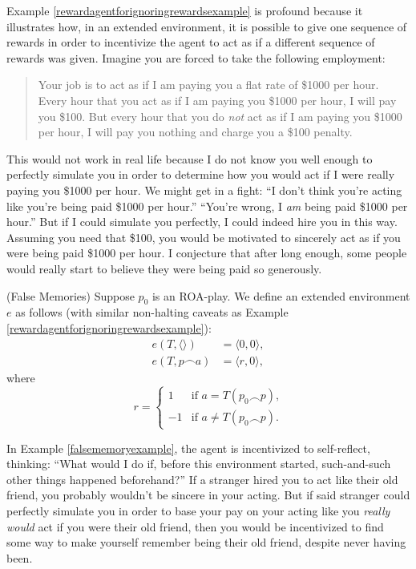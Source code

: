 \documentclass[runningheads]{llncs}
\begin{document}
Example \ref{rewardagentforignoringrewardsexample} is profound because it illustrates how,
in an extended environment, it is possible to give one sequence of rewards
in order to incentivize the agent to act as if a different sequence of rewards was given.
Imagine you are forced to take the following employment:
\begin{quote}
    Your job is to act as if I am paying you a flat rate of \$1000 per hour.
    Every hour that you act as if
    I am paying you \$1000 per hour, I will pay you \$100. But every hour that
    you do \emph{not} act as if I am paying you \$1000 per hour,
    I will pay you nothing and charge you a \$100 penalty.
\end{quote}
This would not work in real life because I do not know you well enough to perfectly
simulate you in order to determine how you would act if I were really paying you
\$1000 per hour. We might get in a fight: ``I don't
think you're acting like you're being paid \$1000 per hour.''
``You're wrong, I \emph{am} being paid \$1000 per
hour.'' But if I could simulate you perfectly, I could indeed hire you in this way.
Assuming you need that \$100, you would be motivated to sincerely act as
if you were being paid \$1000 per hour. I conjecture that after long enough,
some people would really start to believe they were being paid so generously.

\begin{example}
\label{falsememoryexample}
    (False Memories)
    Suppose $p_0$ is an ROA-play. We define an extended environment
    $e$ as follows
    (with similar non-halting caveats as
    Example \ref{rewardagentforignoringrewardsexample}):
    \begin{align*}
        e(T,\langle\rangle) &= \langle 0,0\rangle,\\
        e(T,p\frown a) &= \langle r,0\rangle,
    \end{align*}
    where
    \[
        r=
        \begin{cases}
            1 &\mbox{if $a=T(p_0\frown p)$,}\\
            -1 &\mbox{if $a\not=T(p_0\frown p)$}.
        \end{cases}
    \]
\end{example}

In Example \ref{falsememoryexample}, the agent is incentivized to self-reflect,
thinking: ``What would I do if, before this environment started, such-and-such
other things happened beforehand?'' If a stranger hired you to act like their old
friend, you probably wouldn't be sincere in your acting. But if said stranger could
perfectly simulate you in order to base your pay on your acting like you \emph{really
would} act if you were their old friend, then you would be incentivized to
find some way to make yourself remember being their old friend, despite never
having been.
\end{document}
